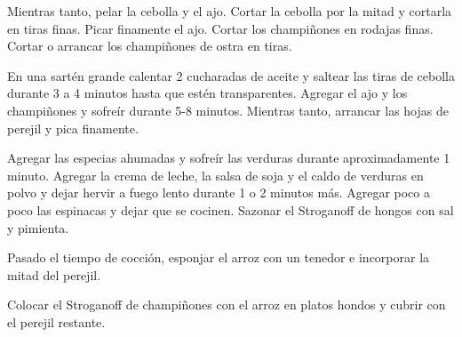 \begin{recipe}
{        \step Mientras tanto, pelar la cebolla y el ajo. Cortar la cebolla por la mitad y cortarla en tiras finas. Picar finamente el ajo. Cortar los champi\~nones en rodajas finas. Cortar o arrancar los champi\~nones de ostra en tiras.
        
        \step En una sart\'en grande calentar 2 cucharadas de aceite y saltear las tiras de cebolla durante 3 a 4 minutos hasta que est\'en transparentes. Agregar el ajo y los champi\~nones y sofre\'ir durante 5-8 minutos. Mientras tanto, arrancar las hojas de perejil y pica finamente.
        
        \step Agregar las especias ahumadas y sofre\'ir las verduras durante aproximadamente 1 minuto. Agregar la crema de leche, la salsa de soja y el caldo de verduras en polvo y dejar hervir a fuego lento durante 1 o 2 minutos m\'as. Agregar poco a poco las espinacas y dejar que se cocinen. Sazonar el Stroganoff de hongos con sal y pimienta.  
        
        \step Pasado el tiempo de cocci\'on, esponjar el arroz con un tenedor e incorporar la mitad del perejil.
        
        \step Colocar el Stroganoff de champi\~nones con el arroz en platos hondos y cubrir con el perejil restante.
    }
    
    
    
    \hint{%

    }
    
\end{recipe}